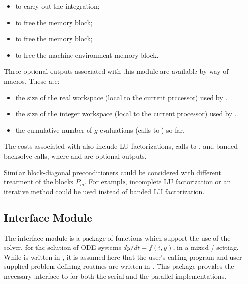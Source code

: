 \begin{itemize}
\item  {} 
  to carry out the integration;
  
\item  {} 
  to free the {\cvbbdpre} memory block;
  
\item  {} 
  to free the {\cvode} memory block;
  
\item  {}
  to free the machine environment memory block.

\end{itemize}

\noindent Three optional outputs associated with this module are available by way of
macros. 
These are:
\begin{itemize}
\item  {} the size of the real workspace (local to
  the current processor) used by {\cvbbdpre}.
\item  {} the size of the integer workspace (local to
  the current processor) used by {\cvbbdpre}.
\item  {} the cumulative number of $g$ evaluations (calls
  to ) so far.
\end{itemize}

The costs associated with {\cvbbdpre} also include  LU
factorizations,  calls to , and  banded
backsolve calls, where  and  are optional {\cvode}
outputs.

Similar block-diagonal preconditioners could be considered with different
treatment of the blocks $P_m$. For example, incomplete LU factorization or
an iterative method could be used instead of banded LU factorization.

\subsection{{\cvode} {\F} Interface Module}\label{ss:fcmix}

The {\fcvode} interface module is a package of {\C} functions which support
the use of the {\cvode} solver, for the solution of ODE systems 
$dy/dt = f(t,y)$, in a mixed {\F}/{\C} setting.  While {\cvode} is written
in {\C}, it is assumed here that the user's calling program and
user-supplied problem-defining routines are written in {\F}.
This package provides the necessary interface to {\cvode} for both the
serial and the parallel {\nvector} implementations.

